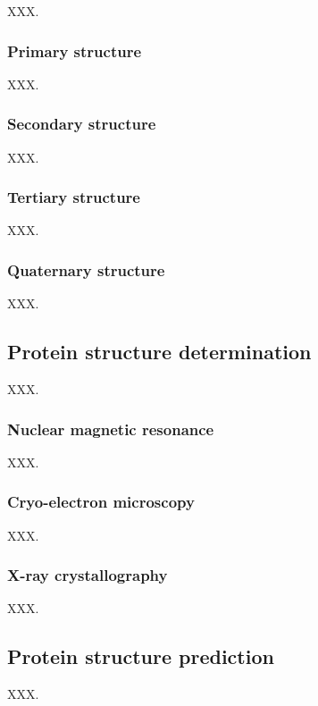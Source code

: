 XXX.

\subsubsection{Primary structure}

XXX.

\subsubsection{Secondary structure}

XXX.

\subsubsection{Tertiary structure}

XXX.

\subsubsection{Quaternary structure}

XXX.

\subsection{Protein structure determination}

XXX.

\subsubsection{Nuclear magnetic resonance}

XXX.

\subsubsection{Cryo-electron microscopy}

XXX.

\subsubsection{X-ray crystallography}

XXX.

\subsection{Protein structure prediction}

XXX.

